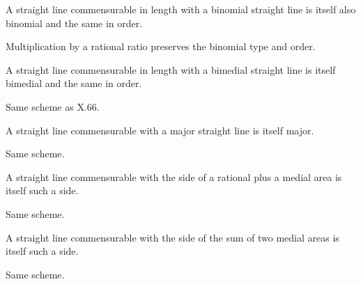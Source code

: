 \begin{claim}
\label{prop:X.66}
A straight line commensurable in length with a binomial straight
line is itself also binomial and the same in order.
\end{claim}
\begin{evidence}[Proof of X.66]
\label{ev:X.66}
Multiplication by a rational ratio preserves the binomial type and
order.
\end{evidence}

\begin{claim}
\label{prop:X.67}
A straight line commensurable in length with a bimedial straight
line is itself bimedial and the same in order.
\end{claim}
\begin{evidence}[Proof of X.67]
\label{ev:X.67}
Same scheme as X.66.
\end{evidence}

\begin{claim}
\label{prop:X.68}
A straight line commensurable with a major straight line is itself
major.
\end{claim}
\begin{evidence}[Proof of X.68]
\label{ev:X.68}
Same scheme.
\end{evidence}

\begin{claim}
\label{prop:X.69}
A straight line commensurable with the side of a rational plus a
medial area is itself such a side.
\end{claim}
\begin{evidence}[Proof of X.69]
\label{ev:X.69}
Same scheme.
\end{evidence}

\begin{claim}
\label{prop:X.70}
A straight line commensurable with the side of the sum of two medial
areas is itself such a side.
\end{claim}
\begin{evidence}[Proof of X.70]
\label{ev:X.70}
Same scheme.
\end{evidence}


